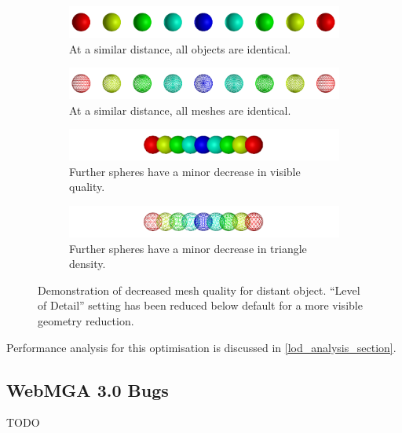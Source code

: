 \begin{figure}
  \begin{center}
    \begin{subfigure}{\textwidth}
      \includegraphics[width=\textwidth]{assets/images/lod/a}
      \caption{At a similar distance, all objects are identical.}
      \label{fig:lod_a}
    \end{subfigure}
    \begin{subfigure}{\textwidth}
      \includegraphics[width=\textwidth]{assets/images/lod/a_w}
      \caption{At a similar distance, all meshes are identical.}
      \label{fig:lod_a_w}
    \end{subfigure}
    \begin{subfigure}{\textwidth}
      \includegraphics[width=\textwidth]{assets/images/lod/b}
      \caption{Further spheres have a minor decrease in visible quality.}
      \label{fig:lod_b}
    \end{subfigure}
    \begin{subfigure}{\textwidth}
      \includegraphics[width=\textwidth]{assets/images/lod/b_w}
      \caption{Further spheres have a minor decrease in triangle density.}
      \label{fig:lod_b_w}
    \end{subfigure}
  \end{center}
  \caption{Demonstration of decreased mesh quality for distant object. ``Level of Detail'' setting has been reduced below default for a more visible geometry reduction.}
  \label{fig:lod_spin}
\end{figure}

Performance analysis for this optimisation is discussed in \cref{lod_analysis_section}.
\subsection{WebMGA 3.0 Bugs}
TODO
